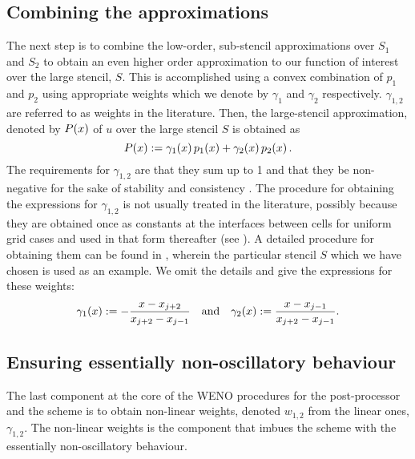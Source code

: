 \documentclass{amsart}
\theoremstyle{definition}
\theoremstyle{remark}
\numberwithin{equation}{section}
\begin{document}
	\subsection{Combining the approximations}
	The next step is to combine the low-order, sub-stencil approximations over $S_1$ and $S_2$ to obtain an even higher order approximation to our function of interest over the large stencil, $S$.  This is accomplished using a convex combination of $p_1$ and $p_2$ using appropriate weights which we denote by $\gamma_1$ and $\gamma_2$ respectively. $\gamma_{1,2}$ are referred to as weights in the literature.  Then, the large-stencil approximation, denoted by $P\!\left({x}\right)$  of $u$ over the large stencil $S$ is obtained as
	\begin{equation}
P\!\left({x}\right):= \gamma_1\!\left({x}\right)p_1\!\left({x}\right)+  \gamma_2\!\left({x}\right)p_2\!\left({x}\right).
	\end{equation} 
The requirements for $\gamma_{1,2}$ are that they sum up to 1 and that they be non-negative for the sake of stability and consistency \cite{janett2019novel}. 
The procedure for obtaining the expressions for $\gamma_{1,2}$ is not usually treated in the literature,  possibly because  they are obtained once as constants  at the interfaces between cells for uniform grid cases and used in that form thereafter (see \cite{shu1988efficient}).  A detailed procedure for obtaining them can be found in \cite[\S3.1]{carlini2005weighted}, wherein the particular stencil $S$ which we have chosen is used as an example.  We omit the details and give the expressions for these weights:
\begin{equation}
	\begin{aligned}
		\gamma_1\!\left({x}\right):= -\frac{x-x_{j+2}}{x_{j+2}-x_{j-1}}\quad\text{and}\quad 
		\gamma_2\!\left({x}\right):= \frac{x-x_{j-1}}{x_{j+2}-x_{j-1}}.
	\end{aligned}
\end{equation}
	
	\subsection{Ensuring essentially non-oscillatory behaviour}  The last component at the core of the WENO procedures for the post-processor and the scheme is to obtain non-linear weights, denoted $w_{1,2}$ from the linear ones, $\gamma_{1,2}$.  The non-linear weights is the component that imbues the scheme with the essentially non-oscillatory behaviour.
	
\end{document}
